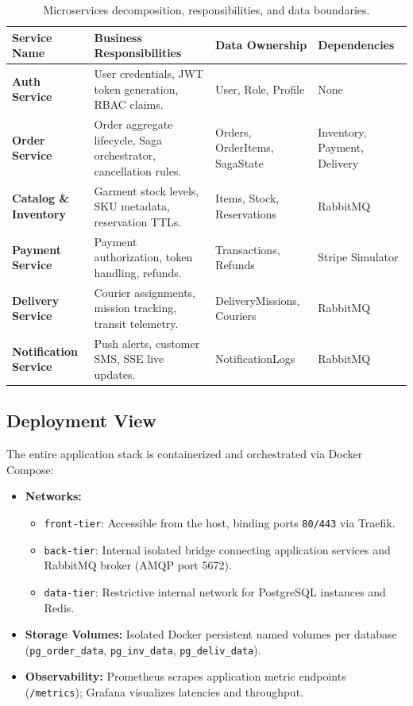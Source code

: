 \documentclass[11pt,a4paper]{article}
\begin{document}
\begin{table}[h]
\centering
\small
\begin{tabularx}{\textwidth}{p{3.5cm} X p{3.2cm} p{2.8cm}}
\toprule
\textbf{Service Name} & \textbf{Business Responsibilities} & \textbf{Data Ownership} & \textbf{Dependencies} \\
\midrule
\textbf{Auth Service} & User credentials, JWT token generation, RBAC claims. & User, Role, Profile & None \\
\textbf{Order Service} & Order aggregate lifecycle, Saga orchestrator, cancellation rules. & Orders, OrderItems, SagaState & Inventory, Payment, Delivery \\
\textbf{Catalog \& Inventory} & Garment stock levels, SKU metadata, reservation TTLs. & Items, Stock, Reservations & RabbitMQ \\
\textbf{Payment Service} & Payment authorization, token handling, refunds. & Transactions, Refunds & Stripe Simulator \\
\textbf{Delivery Service} & Courier assignments, mission tracking, transit telemetry. & DeliveryMissions, Couriers & RabbitMQ \\
\textbf{Notification Service} & Push alerts, customer SMS, SSE live updates. & NotificationLogs & RabbitMQ \\
\bottomrule
\end{tabularx}
\caption{Microservices decomposition, responsibilities, and data boundaries.}
\end{table}

\subsection{Deployment View}
The entire application stack is containerized and orchestrated via Docker Compose:
\begin{itemize}
    \item \textbf{Networks:}
    \begin{itemize}[noitemsep]
        \item \texttt{front-tier}: Accessible from the host, binding ports \texttt{80/443} via Traefik.
        \item \texttt{back-tier}: Internal isolated bridge connecting application services and RabbitMQ broker (AMQP port 5672).
        \item \texttt{data-tier}: Restrictive internal network for PostgreSQL instances and Redis.
    \end{itemize}
    \item \textbf{Storage Volumes:} Isolated Docker persistent named volumes per database (\texttt{pg\_order\_data}, \texttt{pg\_inv\_data}, \texttt{pg\_deliv\_data}).
    \item \textbf{Observability:} Prometheus scrapes application metric endpoints (\texttt{/metrics}); Grafana visualizes latencies and throughput.
\end{itemize}
\end{document}

